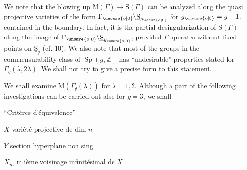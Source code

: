 We note that the blowing up $\mathrm{M}(\Gamma)\longrightarrow\mathrm{S}(\Gamma)$ can be analyzed along the quasi projective varieties of the form $\Gamma_{\unsure{o|0}}\backslash\underline{\mathrm{S}}_{g_{\unsure{o|0}}}$ for $g_{\unsure{o|0}}=g-1$, contained in the boundary. In fact, it is the partial desingularization of $\mathrm{S}(\Gamma)$ along the image of $\Gamma_{\unsure{o|0}}\backslash\underline{\mathrm{S}}_{g_{\unsure{o|0}}}$, provided $\Gamma$ operates without fixed points on $\underline{\mathrm{S}}_g$ (cf. 10). We also note that most of the groups in the commensurability class of $\operatorname{Sp}(g,\mathbb{Z})$ has ``undesirable'' properties stated for $\Gamma_g(\lambda,2\lambda)$. We shall not try to give a precise form to this statement.

We shall examine $\mathrm{M}(\Gamma_g(\lambda))$ for $\lambda=1,2$. Although a part of the following investigations can be carried out also for $g=3$, we shall

``Critères d'équivalence''


$X$ variété projective   de dim $n$

$Y$ section hyperplane  non sing

$X_m$ m.ième voisinage infinitésimal de $X$


